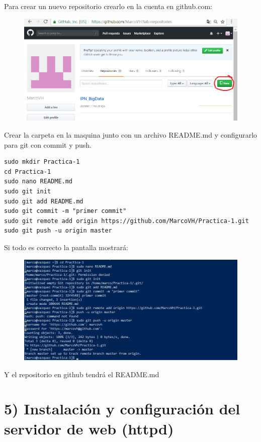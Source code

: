 \documentclass[]{article}
\begin{document}
Para crear un nuevo repositorio crearlo en la cuenta en github.com:

\begin{figure}[htbp]
\centering
\includegraphics{github.png}
\end{figure}

Crear la carpeta en la maquina junto con un archivo README.md y
configurarlo para git con commit y push.

\begin{verbatim}
sudo mkdir Practica-1
cd Practica-1
sudo nano README.md
sudo git init
sudo git add README.md
sudo git commit -m "primer commit"
sudo git remote add origin https://github.com/MarcoVH/Practica-1.git
sudo git push -u origin master
\end{verbatim}

Si todo es correcto la pantalla mostrará:

\begin{figure}[htbp]
\centering
\includegraphics{git.png}
\end{figure}

Y el repositorio en github tendrá el README.md

\section{5) Instalación y configuración del servidor de web
(httpd)}\label{instalacion-y-configuracion-del-servidor-de-web-httpd}
\end{document}
